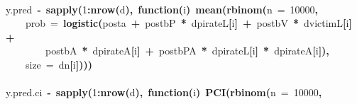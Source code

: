 \documentclass{article}
\makeatletter
\newcommand{\hlnumber}[1]{\textcolor[rgb]{0,0,0}{#1}}%
\newcommand{\hlfunctioncall}[1]{\textcolor[rgb]{.5,0,.33}{\textbf{#1}}}%
\newcommand{\hlkeyword}[1]{\textbf{#1}}%
\newcommand{\hlargument}[1]{\textcolor[rgb]{.69,.25,.02}{#1}}%
\newcommand{\hlformalargs}[1]{\hlargument{#1}}%
\newcommand{\hlassignement}[1]{\textbf{#1}}%
\newcommand{\hlsymbol}[1]{#1}%
\newcommand{\hlstd}[1]{\textcolor[rgb]{0,0,0}{#1}}%
\newenvironment{kframe}{%
 \def\FrameCommand##1{\hskip\@totalleftmargin \hskip-\fboxsep
 \colorbox{shadecolor}{##1}\hskip-\fboxsep
     \hskip-\linewidth \hskip-\@totalleftmargin \hskip\columnwidth}%
 \MakeFramed {\advance\hsize-\width
   \@totalleftmargin\z@ \linewidth\hsize
   \@setminipage}}%
 {\par\unskip\endMakeFramed}
\newenvironment{knitrout}{}{} %
\makeatother
\begin{document}
\begin{knitrout}
{\begin{kframe}
\begin{flushleft}
\hlstd{}\hspace*{\fill}\\
\hlstd{}\hlsymbol{y.pred}{\ }\hlassignement{\usebox{\hlnormalsizeboxlessthan}-}{\ }\hlfunctioncall{sapply}\hlkeyword{(}\hlnumber{1}\hlkeyword{:}\hlfunctioncall{nrow}\hlkeyword{(}\hlsymbol{d}\hlkeyword{)}\hlkeyword{,}{\ }\hlkeyword{function}\hlkeyword{(}\hlformalargs{i}\hlkeyword{)}{\ }\hlfunctioncall{mean}\hlkeyword{(}\hlfunctioncall{rbinom}\hlkeyword{(}\hlargument{n}{\ }\hlargument{=}{\ }\hlnumber{10000}\hlkeyword{,}\hspace*{\fill}\\
\hlstd{}{\ }{\ }{\ }{\ }\hlargument{prob}{\ }\hlargument{=}{\ }\hlfunctioncall{logistic}\hlkeyword{(}\hlsymbol{post}\hlkeyword{\usebox{\hlnormalsizeboxdollar}}\hlsymbol{a}{\ }\hlkeyword{+}{\ }\hlsymbol{post}\hlkeyword{\usebox{\hlnormalsizeboxdollar}}\hlsymbol{bP}{\ }\hlkeyword{*}{\ }\hlsymbol{d}\hlkeyword{\usebox{\hlnormalsizeboxdollar}}\hlsymbol{pirateL}\hlkeyword{[}\hlsymbol{i}\hlkeyword{]}{\ }\hlkeyword{+}{\ }\hlsymbol{post}\hlkeyword{\usebox{\hlnormalsizeboxdollar}}\hlsymbol{bV}{\ }\hlkeyword{*}{\ }\hlsymbol{d}\hlkeyword{\usebox{\hlnormalsizeboxdollar}}\hlsymbol{victimL}\hlkeyword{[}\hlsymbol{i}\hlkeyword{]}{\ }\hlkeyword{+}\hspace*{\fill}\\
\hlstd{}{\ }{\ }{\ }{\ }{\ }{\ }{\ }{\ }\hlsymbol{post}\hlkeyword{\usebox{\hlnormalsizeboxdollar}}\hlsymbol{bA}{\ }\hlkeyword{*}{\ }\hlsymbol{d}\hlkeyword{\usebox{\hlnormalsizeboxdollar}}\hlsymbol{pirateA}\hlkeyword{[}\hlsymbol{i}\hlkeyword{]}{\ }\hlkeyword{+}{\ }\hlsymbol{post}\hlkeyword{\usebox{\hlnormalsizeboxdollar}}\hlsymbol{bPA}{\ }\hlkeyword{*}{\ }\hlsymbol{d}\hlkeyword{\usebox{\hlnormalsizeboxdollar}}\hlsymbol{pirateL}\hlkeyword{[}\hlsymbol{i}\hlkeyword{]}{\ }\hlkeyword{*}{\ }\hlsymbol{d}\hlkeyword{\usebox{\hlnormalsizeboxdollar}}\hlsymbol{pirateA}\hlkeyword{[}\hlsymbol{i}\hlkeyword{]}\hlkeyword{)}\hlkeyword{,}\hspace*{\fill}\\
\hlstd{}{\ }{\ }{\ }{\ }\hlargument{size}{\ }\hlargument{=}{\ }\hlsymbol{d}\hlkeyword{\usebox{\hlnormalsizeboxdollar}}\hlsymbol{n}\hlkeyword{[}\hlsymbol{i}\hlkeyword{]}\hlkeyword{)}\hlkeyword{)}\hlkeyword{)}\hspace*{\fill}\\
\hlstd{}\hspace*{\fill}\\
\hlstd{}\hlsymbol{y.pred.ci}{\ }\hlassignement{\usebox{\hlnormalsizeboxlessthan}-}{\ }\hlfunctioncall{sapply}\hlkeyword{(}\hlnumber{1}\hlkeyword{:}\hlfunctioncall{nrow}\hlkeyword{(}\hlsymbol{d}\hlkeyword{)}\hlkeyword{,}{\ }\hlkeyword{function}\hlkeyword{(}\hlformalargs{i}\hlkeyword{)}{\ }\hlfunctioncall{PCI}\hlkeyword{(}\hlfunctioncall{rbinom}\hlkeyword{(}\hlargument{n}{\ }\hlargument{=}{\ }\hlnumber{10000}\hlkeyword{,}\hspace*{\fill}\\

\end{flushleft}
\end{kframe}}
\end{knitrout}
\end{document}
